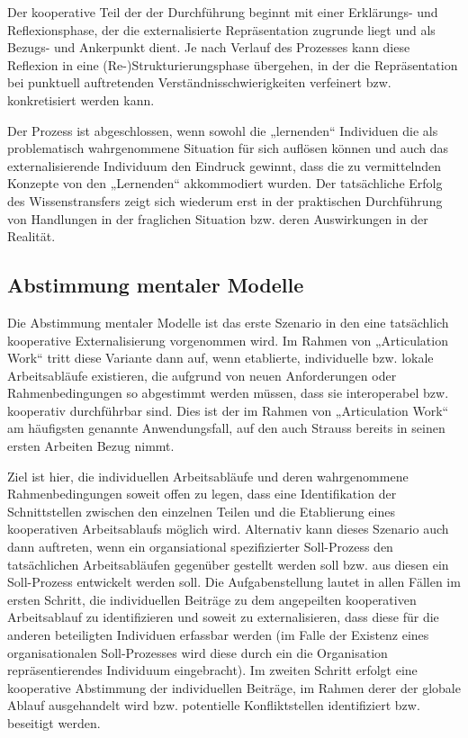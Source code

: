Der kooperative Teil der der Durchführung beginnt mit einer Erklärungs- und Reflexionsphase, der die externalisierte Repräsentation zugrunde liegt und als Bezugs- und Ankerpunkt dient. Je nach Verlauf des Prozesses kann diese Reflexion in eine (Re-)Strukturierungsphase übergehen, in der die Repräsentation bei punktuell auftretenden Verständnisschwierigkeiten verfeinert bzw. konkretisiert werden kann. 

Der Prozess ist abgeschlossen, wenn sowohl die „lernenden“ Individuen die als problematisch wahrgenommene Situation für sich auflösen können und auch das externalisierende Individuum den Eindruck gewinnt, dass die zu vermittelnden Konzepte von den „Lernenden“ akkommodiert wurden. Der tatsächliche Erfolg des Wissenstransfers zeigt sich wiederum erst in der praktischen Durchführung von Handlungen in der fraglichen Situation bzw. deren Auswirkungen in der Realität.


\subsection{Abstimmung mentaler Modelle} %
\label{sub:abstimmung_individueller_mentaler_modelle}

Die Abstimmung mentaler Modelle ist das erste Szenario in den eine tatsächlich kooperative Externalisierung vorgenommen wird. Im Rahmen von „Articulation Work“ tritt diese Variante dann auf, wenn etablierte, individuelle bzw. lokale Arbeitsabläufe existieren, die aufgrund von neuen Anforderungen oder Rahmenbedingungen so abgestimmt werden müssen, dass sie interoperabel bzw. kooperativ durchführbar sind. Dies ist der im Rahmen von „Articulation Work“ am häufigsten genannte Anwendungsfall, auf den auch Strauss bereits in seinen ersten Arbeiten Bezug nimmt.

Ziel ist hier, die individuellen Arbeitsabläufe und deren wahrgenommene Rahmenbedingungen soweit offen zu legen, dass eine Identifikation der Schnittstellen zwischen den einzelnen Teilen und die Etablierung eines kooperativen Arbeitsablaufs möglich wird. Alternativ kann dieses Szenario auch dann auftreten, wenn ein organsiational spezifizierter Soll-Prozess den tatsächlichen Arbeitsabläufen gegenüber gestellt werden soll bzw. aus diesen ein Soll-Prozess entwickelt werden soll. Die Aufgabenstellung lautet in allen Fällen im ersten Schritt, die individuellen Beiträge zu dem angepeilten kooperativen Arbeitsablauf zu identifizieren und soweit zu externalisieren, dass diese für die anderen beteiligten Individuen erfassbar werden (im Falle der Existenz eines organisationalen Soll-Prozesses wird diese durch ein die Organisation repräsentierendes Individuum eingebracht). Im zweiten Schritt erfolgt eine kooperative Abstimmung der individuellen Beiträge, im Rahmen derer der globale Ablauf ausgehandelt wird bzw. potentielle Konfliktstellen identifiziert bzw. beseitigt werden.

